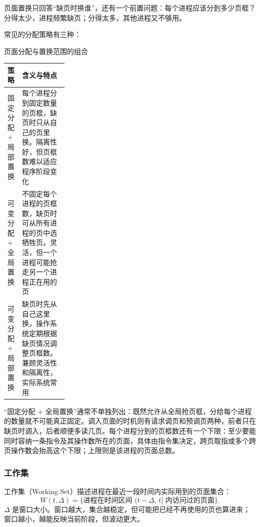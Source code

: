 页面置换只回答“缺页时换谁”，还有一个前置问题：每个进程应该分到多少页框？分得太少，进程频繁缺页；分得太多，其他进程又不够用。

常见的分配策略有三种：

\begin{tablebox}{页面分配与置换范围的组合}
\centering
\begin{tabularx}{\linewidth}{|p{0.24\linewidth}|X|}
\hline
策略 & 含义与特点 \\
\hline
固定分配 $+$ 局部置换 & 每个进程分到固定数量的页框，缺页时只从自己的页里换。隔离性好，但页框数难以适应程序阶段变化 \\
\hline
可变分配 $+$ 全局置换 & 不固定每个进程的页框数，缺页时可从所有进程的页中选牺牲页。灵活，但一个进程可能抢走另一个进程正在用的页 \\
\hline
可变分配 $+$ 局部置换 & 缺页时先从自己这里换，操作系统定期根据缺页情况调整页框数。兼顾灵活性和隔离性，实际系统常用 \\
\hline
\end{tabularx}
\end{tablebox}

“固定分配 $+$ 全局置换”通常不单独列出：既然允许从全局抢页框，分给每个进程的数量就不可能真正固定。调入页面的时机则有请求调页和预调页两种，前者只在缺页时调入，后者顺便多读几页。每个进程分到的页框数还有一个下限：至少要能同时容纳一条指令及其操作数所在的页面，具体由指令集决定，跨页取指或多个跨页操作数会抬高这个下限；上限则是该进程的页面总数。

\subsubsection{工作集}

工作集（Working Set）描述进程在最近一段时间内实际用到的页面集合：
\[
W(t,\Delta)=\{\text{进程在时间区间 }(t-\Delta,\,t]\text{ 内访问过的页面}\}.
\]
$\Delta$ 是窗口大小。窗口越大，集合越稳定，但可能把已经不再使用的页也算进来；窗口越小，越能反映当前阶段，但波动更大。

\begin{center}
\end{center}

